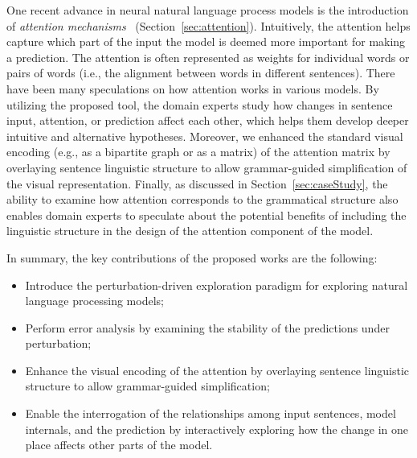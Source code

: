 One recent advance in neural natural language process models is the introduction of \emph{attention mechanisms}~\cite{VaswaniShazeerParmar2017} (Section~\ref{sec:attention}). Intuitively, the attention helps capture which part of the input the model is deemed more important for making a prediction. The attention is often represented as weights for individual words or pairs of words (i.e., the alignment between words in different sentences).
%
There have been many speculations on how attention works in various models. By utilizing the proposed tool, the domain experts study how changes in sentence input, attention, or prediction affect each other, which helps them develop deeper intuitive and alternative hypotheses. 
Moreover, we enhanced the standard visual encoding (e.g., as a bipartite graph or as a matrix) of the attention matrix by overlaying sentence linguistic structure to allow grammar-guided simplification of the visual representation.
%
Finally, as discussed in Section~\ref{sec:caseStudy}, the ability to examine how attention corresponds to the grammatical structure also enables domain experts to speculate about the potential benefits of including the linguistic structure in the design of the attention component of the model.

In summary, the key contributions of the proposed works are the following:
\begin{itemize}
    \item Introduce the perturbation-driven exploration paradigm for exploring natural language processing models;

    \item Perform error analysis by examining the stability of the predictions under perturbation;

    \item Enhance the visual encoding of the attention by overlaying sentence linguistic structure to allow grammar-guided simplification;

    \item Enable the interrogation of the relationships among input sentences, model internals, and the prediction by interactively exploring how the change in one place affects other parts of the model.
\end{itemize}
%

